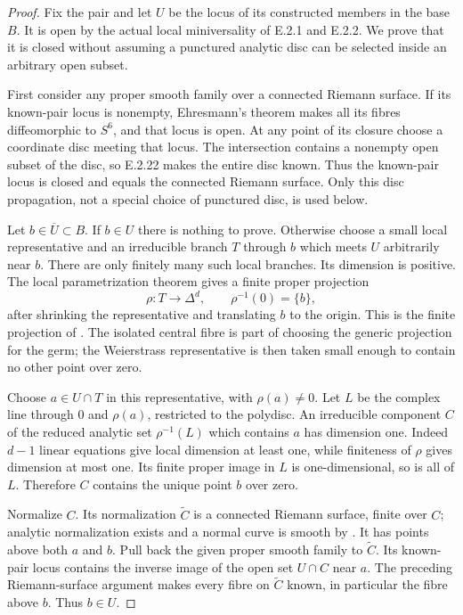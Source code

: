 \begin{proof}
Fix the pair and let $U$ be the locus of its constructed
members in the base $B$.  It is open by the actual local
miniversality of E.2.1 and E.2.2.  We prove that it is
closed without assuming a punctured analytic disc can
be selected inside an arbitrary open subset.

First consider any proper smooth family over a connected
Riemann surface.  If its known-pair locus is nonempty,
Ehresmann's theorem makes all its fibres diffeomorphic
to $S^6$, and that locus is open.  At any point of its closure choose a
coordinate disc meeting that locus.  The intersection
contains a nonempty open subset of the disc, so E.2.22
makes the entire disc known.  Thus the known-pair locus
is closed and equals the connected Riemann surface.
Only this disc propagation, not a special choice of
punctured disc, is used below.

Let $b\in\overline U\subset B$.  If $b\in U$ there
is nothing to prove.  Otherwise choose a small local
representative and an irreducible branch $T$ through
$b$ which meets $U$ arbitrarily near $b$.  There are
only finitely many such local branches.  Its dimension
is positive.  The local parametrization theorem gives
a finite proper projection
\[
 \rho:T\longrightarrow\Delta^d,
 \qquad \rho^{-1}(0)=\{b\},
 \tag{E.2.23.1}
\]
after shrinking the representative and translating
$b$ to the origin.  This is the finite projection
of \citet[Chapter~II, Theorem~4.19, pp.~95--96]{Demailly2012E}.
The isolated central fibre is part of choosing
the generic projection for the germ; the
Weierstrass representative is then taken small
enough to contain no other point over zero.

Choose $a\in U\cap T$ in this representative,
with $\rho(a)\ne0$.  Let $L$ be the complex
line through $0$ and $\rho(a)$, restricted
to the polydisc.  An irreducible component
$C$ of the reduced analytic set
$\rho^{-1}(L)$ which contains $a$ has
dimension one.  Indeed $d-1$ linear
equations give local dimension at least
one, while finiteness of $\rho$ gives
dimension at most one.  Its finite
proper image in $L$ is one-dimensional,
so is all of $L$.  Therefore $C$ contains
the unique point $b$ over zero.

Normalize $C$.  Its normalization
$\widetilde C$ is a connected Riemann
surface, finite over $C$; analytic
normalization exists and a normal
curve is smooth by
\cite[Chapter~II, Theorems~7.6 and~7.12]{Demailly2012E}.
It has points above both $a$ and $b$.
Pull back the given proper smooth
family to $\widetilde C$.  Its
known-pair locus contains the
inverse image of the open set
$U\cap C$ near $a$.  The preceding
Riemann-surface argument makes
every fibre on $\widetilde C$
known, in particular the fibre
above $b$.  Thus $b\in U$.


\end{proof}
